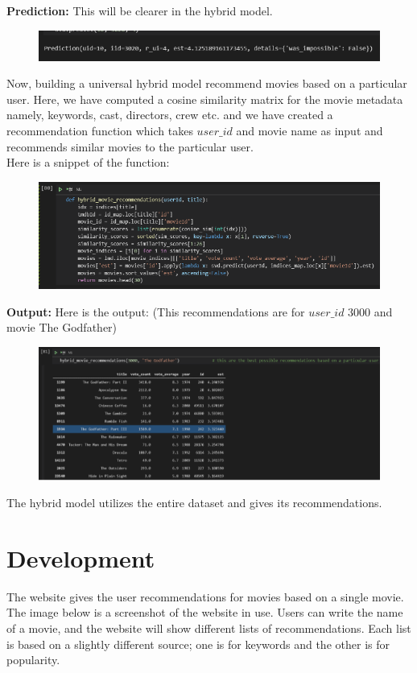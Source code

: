 \documentclass[10pt,conference]{IEEEtran}
\begin{document}
\begin{itemize}
\textbf{Prediction:} This will be clearer in the hybrid model.
\begin{figure}[H]
\centering
\includegraphics[scale=.5]{prediction.png}
\label{fig:Prediction}
\end{figure}
Now, building a universal hybrid model recommend movies based on a particular user. Here, we have computed a cosine similarity matrix for the movie metadata namely, keywords, cast, directors, crew etc. and we have created a recommendation function which takes ${user\_id}$ and movie name as input and recommends similar movies to the particular user. \\
Here is a snippet of the function: \\
\begin{figure}[H]
\centering
\includegraphics[scale=.5]{function.png}
\label{fig:Function}
\end{figure}
\textbf{Output:} Here is the output: (This recommendations are for ${user\_id}$ 3000 and movie The Godfather)
\begin{figure}[H]
\centering
\includegraphics[scale=.5]{output.png}
\label{fig:Output}
\end{figure}
The hybrid model utilizes the entire dataset and gives its recommendations.
\end{itemize}

\section{Development}\label{sec:4. Development}
The website gives the user recommendations for movies based on a single movie. The image below is a screenshot of the website in use. Users can write the name of a movie, and the website will show different lists of recommendations. Each list is based on a slightly different source; one is for keywords and the other is for popularity.
\end{document}
